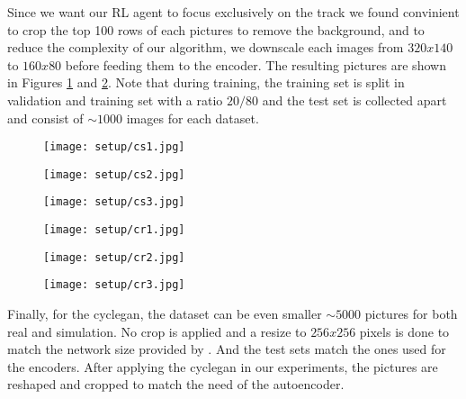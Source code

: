 Since we want our RL agent to focus exclusively on the track we found convinient to crop the top 100 rows of each pictures to remove the background, and to reduce the complexity of our algorithm, we downscale each images from $320x140$ to $160x80$ before feeding them to the encoder. The resulting pictures are shown in Figures \ref{fig:datasetsimcropped} and \ref{fig:datasetrealcropped}. Note that during training, the training set is split in validation and training set with a ratio $20/80$ and the test set is collected apart and consist of $\sim 1000$ images for each dataset.

\begin{figure}[h]
    \begin{minipage}{.33\textwidth}
      \centering
      \texttt{[image: setup/cs1.jpg]}
    \end{minipage}%
    \begin{minipage}{.33\textwidth}
        \centering
        \texttt{[image: setup/cs2.jpg]}
    \end{minipage}%
    \begin{minipage}{.33\textwidth}
        \centering
        \texttt{[image: setup/cs3.jpg]}
    \end{minipage}
    \label{fig:datasetsimcropped}
\end{figure}

\begin{figure}[h]
\begin{minipage}{.33\textwidth}
    \centering
    \texttt{[image: setup/cr1.jpg]}
\end{minipage}%
\begin{minipage}{.33\textwidth}
    \centering
    \texttt{[image: setup/cr2.jpg]}
\end{minipage}%
\begin{minipage}{.33\textwidth}
    \centering
    \texttt{[image: setup/cr3.jpg]}
\end{minipage}
\label{fig:datasetrealcropped}
\end{figure}
Finally, for the cyclegan, the dataset can be even smaller $\sim 5000$ pictures for both real and simulation. No crop is applied and a resize to $256x256$ pixels is done to match the network size provided by \citet{CycleGAN2017}. And the test sets match the ones used for the encoders. After applying the cyclegan in our experiments, the pictures are reshaped and cropped to match the need of the autoencoder.